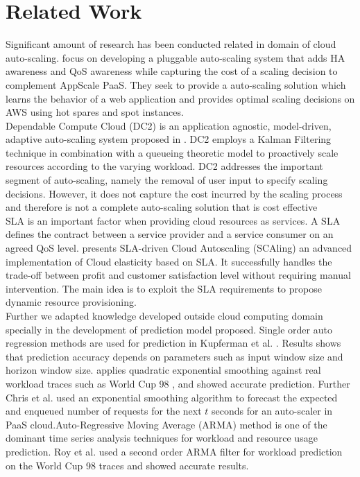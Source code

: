 \section{Related Work}
Significant amount of research has been conducted related in domain of cloud auto-scaling. 
\cite{pluggable} focus on developing a pluggable auto-scaling system that adds HA awareness and QoS awareness while capturing the cost of a scaling decision to complement AppScale PaaS. They seek to provide a auto-scaling solution which learns the behavior of a web application and provides optimal scaling decisions on AWS using hot spares and spot instances.\\

Dependable Compute Cloud (DC2) is an application agnostic, model-driven, adaptive auto-scaling system proposed in \cite{modeldriven}. DC2 employs a Kalman Filtering technique in combination with a queueing theoretic model to proactively scale resources according to the varying workload. DC2 addresses the important segment of auto-scaling, namely the removal of user input to specify scaling decisions. However, it does not capture the cost incurred by the scaling process and therefore is not a complete auto-scaling solution that is cost effective\\

SLA is an important factor when providing cloud resources as services. A SLA defines the contract between a service provider and a service consumer on an agreed QoS level. \cite{sladriven} presents SLA-driven Cloud Autoscaling (SCAling) an advanced implementation of Cloud elasticity based on SLA. It successfully handles the trade-off between profit and customer satisfaction level without requiring manual intervention. The main idea is to exploit the SLA requirements to propose dynamic resource provisioning.\\

Further we adapted knowledge developed outside cloud computing domain specially in the development of prediction model proposed. Single order auto regression methods are used for prediction in Kupferman et al. \cite{Kupferman_2009}. Results shows that prediction accuracy depends on parameters such as input window size and horizon window size. \cite{Mi_2010} applies quadratic exponential smoothing against real workload traces such as World Cup 98 \cite{WorldCup_1998}, and showed accurate prediction. Further Chris et al. used an exponential smoothing algorithm to forecast the expected and enqueued number of requests  for the next $t$ seconds \cite{Bunch_2012} for an auto-scaler in PaaS cloud.Auto-Regressive Moving Average (ARMA) method is one of the dominant time series analysis techniques for workload and resource usage prediction. Roy et al. \cite{Roy_2011} used a second order ARMA filter for workload prediction on the World Cup 98 traces and showed accurate results.\\

